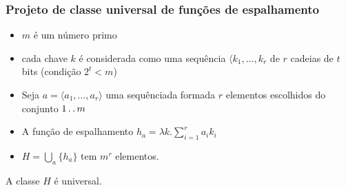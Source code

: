 \documentclass{beamer}
\begin{document}
\begin{frame}

\frametitle{Projeto de classe universal de funções de espalhamento}

\begin{itemize}

\item $m$ é um número primo

\item cada chave $k$ é considerada como uma sequência $\langle k_1, \ldots, k_r$
  de $r$ cadeias de $t$ bits (condição $2^t < m$)

\item Seja $a = \langle a_1, \ldots, a_r \rangle$ uma sequênciada formada $r$
  elementos escolhidos do conjunto $1 \mathinner{\ldotp\ldotp} m$

\item A função de espalhamento $h_a = \lambda k . \sum_{i=1}^{r} a_i k_i$ 

\item $H = \bigcup_a \{ h_{a} \}$ tem $m^r$ elementos.
\end{itemize}

\begin{theorem}

A classe $H$ é universal.

\end{theorem}

\end{frame}
\end{document}
